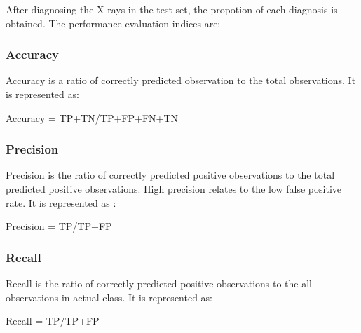 After diagnosing the X-rays in the test set, the propotion of each diagnosis is obtained. The performance evaluation indices are: 

\subsubsection{Accuracy}

Accuracy is a ratio of correctly predicted observation to the total observations. It is represented as: 

Accuracy = TP+TN/TP+FP+FN+TN 

\subsubsection{Precision}

Precision is the ratio of correctly predicted positive observations to the total predicted positive observations. High precision relates to the low false positive rate. It is represented as : 

Precision = TP/TP+FP 

\subsubsection{Recall}

Recall is the ratio of correctly predicted positive observations to the all observations in actual class. It is represented as: 

Recall = TP/TP+FP 
